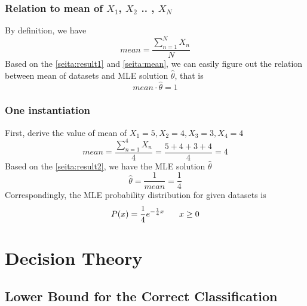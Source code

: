 \documentclass[11pt,a4paper]{article}
\newcommand{\htab}{\hspace*{0.63cm}}
\begin{document}
\subsubsection{Relation to mean of $X_{1}$, $X_{2}$ .. , $X_{N}$}
\htab By definition, we have
    \begin{equation} \label{seita:mean}
        mean = \frac{\sum_{n=1}^{N} X_{n}}{N} 
    \end{equation}
\htab Based on the \eqref{seita:result1} and \eqref{seita:mean},
    we can easily figure out the relation between mean of datasets and MLE solution $\hat{\theta}$, that is
    \begin{equation} \label{seita:result2}
        mean \cdot \hat{\theta} = 1 
    \end{equation}

\subsubsection{One instantiation}
\htab First, derive the value of mean of $X_{1}=5, X_{2}=4, X_{3}=3, X_{4}=4$
    \begin{equation}
        mean = \frac{\sum_{n=1}^{4} {X_{n} }}{4}  = \frac{5 + 4 + 3 + 4}{4} = 4 
    \end{equation}
\htab Based on the \eqref{seita:result2}, we have the MLE solution $\hat{\theta}$
    \begin{equation}
        \hat{\theta} = \frac{1}{mean} = \frac{1}{4}
    \end{equation}
\htab Correspondingly, the MLE probability distribution for given datasets is 
    \begin{equation}
        P(x) = \frac{1}{4} e^{-\frac{1}{4} x} \htab x \geq 0
    \end{equation}
\newpage

\section{Decision Theory}
\subsection{Lower Bound for the Correct Classification}
\end{document}
